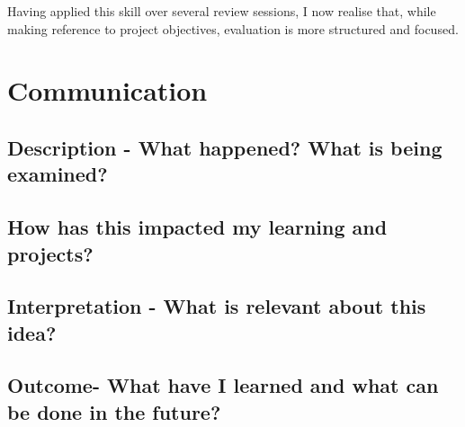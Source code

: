 \documentclass{scrartcl}
\begin{document}
Having applied this skill over several review sessions, I now realise that, while making reference to project objectives, evaluation is more structured and focused.

\section{Communication}

\subsection{Description - What happened? What is being examined?}

\subsection{How has this impacted my learning and projects?}

\subsection{Interpretation - What is relevant about this idea?}

\subsection{Outcome- What have I learned and what can be done in the future?}


%
%
\end{document}
